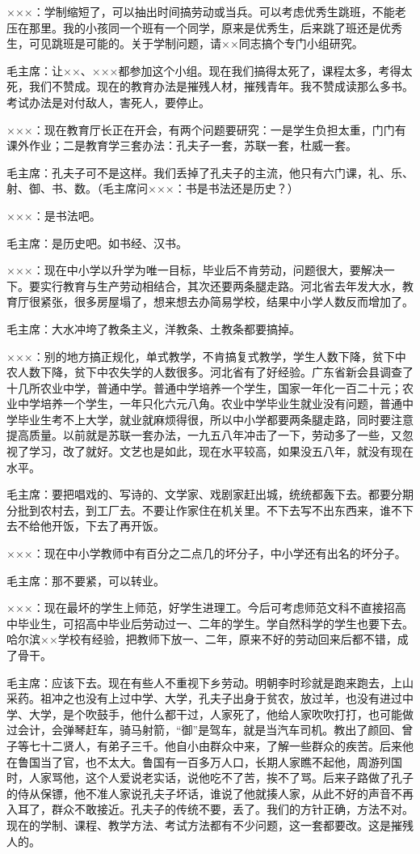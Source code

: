 ×××：学制缩短了，可以抽出时间搞劳动或当兵。可以考虑优秀生跳班，不能老压在那里。我的小孩同一个班有一个同学，原来是优秀生，后来跳了班还是优秀生，可见跳班是可能的。关于学制问题，请××同志搞个专门小组研究。

毛主席：让××、×××都参加这个小组。现在我们搞得太死了，课程太多，考得太死，我们不赞成。现在的教育办法是摧残人材，摧残青年。我不赞成读那么多书。考试办法是对付敌人，害死人，要停止。

×××：现在教育厅长正在开会，有两个问题要研究：一是学生负担太重，门门有课外作业；二是教育学三套办法：孔夫子一套，苏联一套，杜威一套。

毛主席：孔夫子可不是这样。我们丢掉了孔夫子的主流，他只有六门课，礼、乐、射、御、书、数。（毛主席问×××：书是书法还是历史？）

×××：是书法吧。

毛主席：是历史吧。如书经、汉书。

×××：现在中小学以升学为唯一目标，毕业后不肯劳动，问题很大，要解决一下。要实行教育与生产劳动相结合，其次还要两条腿走路。河北省去年发大水，教育厅很紧张，很多房屋塌了，想来想去办简易学校，结果中小学人数反而增加了。

毛主席：大水冲垮了教条主义，洋教条、土教条都要搞掉。

×××：别的地方搞正规化，单式教学，不肯搞复式教学，学生人数下降，贫下中农人数下降，贫下中农失学的人数很多。河北省有了好经验。广东省新会县调查了十几所农业中学，普通中学。普通中学培养一个学生，国家一年化一百二十元；农业中学培养一个学生，一年只化六元八角。农业中学毕业生就业没有问题，普通中学毕业生考不上大学，就业就麻烦得很，所以中小学都要两条腿走路，同时要注意提高质量。以前就是苏联一套办法，一九五八年冲击了一下，劳动多了一些，又忽视了学习，改了就好。文艺也是如此，现在水平较高，如果没五八年，就没有现在水平。

毛主席：要把唱戏的、写诗的、文学家、戏剧家赶出城，统统都轰下去。都要分期分批到农村去，到工厂去。不要让作家住在机关里。不下去写不出东西来，谁不下去不给他开饭，下去了再开饭。

×××：现在中小学教师中有百分之二点几的坏分子，中小学还有出名的坏分子。

毛主席：那不要紧，可以转业。

×××：现在最坏的学生上师范，好学生进理工。今后可考虑师范文科不直接招高中毕业生，可招高中毕业后劳动过一、二年的学生。学自然科学的学生也要下去。哈尔滨××学校有经验，把教师下放一、二年，原来不好的劳动回来后都不错，成了骨干。

毛主席：应该下去。现在有些人不重视下乡劳动。明朝李时珍就是跑来跑去，上山采药。祖冲之也没有上过中学、大学，孔夫子出身于贫农，放过羊，也没有进过中学、大学，是个吹鼓手，他什么都干过，人家死了，他给人家吹吹打打，也可能做过会计，会弹琴赶车，骑马射箭，“御”是驾车，就是当汽车司机。教出了颜回、曾子等七十二贤人，有弟子三千。他自小由群众中来，了解一些群众的疾苦。后来他在鲁国当了官，也不太大。鲁国有一百多万人口，长期人家瞧不起他，周游列国时，人家骂他，这个人爱说老实话，说他吃不了苦，挨不了骂。后来子路做了孔子的侍从保镖，他不准人家说孔夫子坏话，谁说了他就揍人家，从此不好的声音不再入耳了，群众不敢接近。孔夫子的传统不要，丢了。我们的方针正确，方法不对。现在的学制、课程、教学方法、考试方法都有不少问题，这一套都要改。这是摧残人的。

